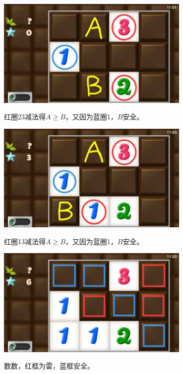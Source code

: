 \subsection{} %
\begin{center}
    \includegraphics[width=0.7\textwidth]{puzzlelow/14-1.jpg}
\end{center}
红圈23减法得$A\ge B$，又因为蓝圈1，$B$安全。
\begin{center}
    \includegraphics[width=0.7\textwidth]{puzzlelow/14-2.jpg}
\end{center}
红圈13减法得$A\ge B$，又因为蓝圈1，$B$安全。
\begin{center}
    \includegraphics[width=0.7\textwidth]{puzzlelow/14-3.jpg}
\end{center}
数数，红框为雷，蓝框安全。

